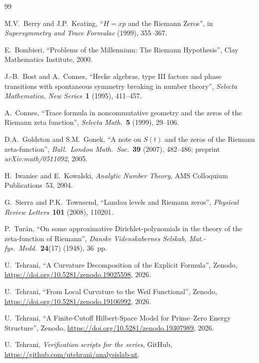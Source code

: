 \documentclass[11pt]{article}
\begin{document}
\newpage
\begin{thebibliography}{99}

M.V.~Berry and J.P.~Keating,
``$H=xp$ and the Riemann Zeros'',
in \emph{Supersymmetry and Trace Formulae} (1999), 355--367.

E.~Bombieri,
``Problems of the Millennium: The Riemann Hypothesis'',
Clay Mathematics Institute, 2000.

J.-B.~Bost and A.~Connes,
``Hecke algebras, type III factors and phase transitions
with spontaneous symmetry breaking in number theory'',
\emph{Selecta Mathematica, New Series}\ \textbf{1} (1995), 411--457.

A.~Connes,
``Trace formula in noncommutative geometry and the zeros
of the Riemann zeta function'',
\emph{Selecta Math.}\ \textbf{5} (1999), 29--106.

D.A.~Goldston and S.M.~Gonek,
``A note on $S(t)$ and the zeros of the Riemann zeta-function'',
\emph{Bull.\ London Math.\ Soc.}\ \textbf{39} (2007), 482--486;
preprint \emph{arXiv:math/0511092}, 2005.

H.~Iwaniec and E.~Kowalski,
\emph{Analytic Number Theory},
AMS Colloquium Publications~53, 2004.

G.~Sierra and P.K.~Townsend,
``Landau levels and Riemann zeros'',
\emph{Physical Review Letters}\ \textbf{101} (2008), 110201.

P.~Tur\'an,
``On some approximative Dirichlet-polynomials in the theory of
the zeta-function of Riemann'',
\emph{Danske Videnskabernes Selskab, Mat.-fys.\ Medd.}\ 
\textbf{24}(17) (1948), 36~pp.

\bibitem{Paper1}
U.~Tehrani,
``A Curvature Decomposition of the Explicit Formula'',
Zenodo, \url{https://doi.org/10.5281/zenodo.19025598}, 2026.

U.~Tehrani,
``From Local Curvature to the Weil Functional'',
Zenodo, \url{https://doi.org/10.5281/zenodo.19106992}, 2026.

U.~Tehrani,
``A Finite-Cutoff Hilbert-Space Model
for Prime--Zero Energy Structure'',
Zenodo, \url{https://doi.org/10.5281/zenodo.19307989}, 2026.

U.~Tehrani,
\emph{Verification scripts for the series},
GitHub, \url{https://github.com/utehrani/analysislab-nt}.

\end{thebibliography}
\end{document}
